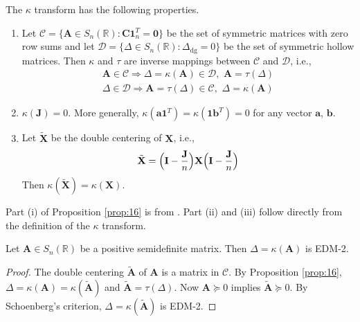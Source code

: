 \begin{proposition}
  \label{prop:16}
  The $\kappa$ transform has the following properties.
  \begin{enumerate}[i]
  \item Let $\mathcal{C} = \{ \mathbf{A} \in S_n(\mathbb{R}) \colon
    \mathbf{C}\bm{1}_{n}^{T} = \bm{0} \}$ be the set of symmetric
    matrices with zero row sums and let $\mathcal{D} = \{ \Delta \in
    S_n(\mathbb{R}) \colon \Delta_{\mathrm{dg}} = 0 \}$ be the set of
    symmetric hollow matrices. Then $\kappa$ and $\tau$ are inverse
    mappings between $\mathcal{C}$ and $\mathcal{D}$, i.e.,
  \begin{gather}
    \label{eq:55}
    \mathbf{A} \in \mathcal{C}
    \Longrightarrow \Delta = \kappa(\mathbf{A}) \in \mathcal{D}, \,\,
    \mathbf{A} = \tau(\Delta) \\
    \Delta \in \mathcal{D} \Longrightarrow \mathbf{A} = \tau(\Delta)
    \in \mathcal{C}, \,\, \Delta = \kappa(\mathbf{A})
  \end{gather}
  \item $\kappa(\mathbf{J}) = 0$. More generally,
    $\kappa(\bm{a}\bm{1}^{T}) = \kappa(\bm{1}\bm{b}^{T}) = 0$
    for any vector $\bm{a}$, $\bm{b}$.
  \item Let $\tilde{\mathbf{X}}$ be the double centering of
    $\mathbf{X}$, i.e.,
  \begin{equation}
    \label{eq:71}
    \tilde{\mathbf{X}} = \Bigl(\mathbf{I} - \frac{\mathbf{J}}{n}\Bigr)\mathbf{X} \Bigl(\mathbf{I} - \frac{\mathbf{J}}{n}\Bigr)
  \end{equation}
  Then $\kappa(\tilde{\mathbf{X}}) = \kappa(\mathbf{X})$.
  \end{enumerate}
\end{proposition}
Part (i) of Proposition \ref{prop:16} is from
\citep{critchley88:_certain_linear_mappin}. Part (ii) and (iii)
follow directly from the definition of the $\kappa$ transform. 
\begin{proposition}
  \label{prop:18}
  Let $\mathbf{A} \in S_n(\mathbb{R})$ be a positive semidefinite
  matrix. Then $\Delta = \kappa(\mathbf{A})$ is EDM-2.
\end{proposition}
\begin{proof}
  The double centering $\tilde{\mathbf{A}}$ of $\mathbf{A}$ is a
  matrix in $\mathcal{C}$. By Proposition
  \ref{prop:16}, $\Delta = \kappa(\mathbf{A}) =
  \kappa(\tilde{\mathbf{A}})$ and $\tilde{\mathbf{A}} =
  \tau(\Delta)$. Now $\mathbf{A} \succeq 0$ implies
  $\tilde{\mathbf{A}} \succeq 0$. By Schoenberg's criterion, $\Delta =
  \kappa(\tilde{\mathbf{A}})$ is EDM-2. 
\end{proof}
%
